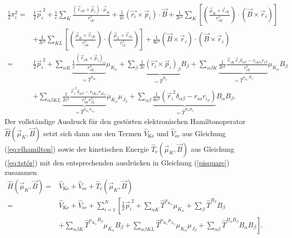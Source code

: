 	\begin{equation}\label{pisquare}
	\begin{aligned}
	\frac{1}{2}\pi_i^2=&\frac{1}{2}\vec{p}_i^{\;2}+\frac{1}{c}\sum_K\frac{(\vec{r}_{iK}\times\vec{p}_{i})\cdot\vec{\mu}_K}{r_{iK}^3}+\frac{1}{2c}(\vec{r_i}\times \vec{p}_i)\cdot \vec{B}+ \frac{1}{2c^2}\sum_K\left[\left(\frac{\vec{\mu}_K\times\vec{r}_{iK}}{r_{iK}^3}\right)\cdot\left(\vec{B}\times\vec{r}_i\right)\right]\\
	&+\frac{1}{2c^2}\sum_{KL}\left[\left(\frac{\vec{\mu}_K\times\vec{r}_{iK}}{r_{iK}^3}\right)\cdot\left(\frac{\vec{\mu}_L\times\vec{r}_{iL}}{r_{iL}^3}\right)\right]+\frac{1}{8c^2}(\vec{B}\times\vec{r}_i)\cdot(\vec{B}\times\vec{r}_i) \\
	=&\frac{1}{2}\vec{p}_i^{\;2}+\sum_{\alpha K}\underbrace{\frac{1}{c}\frac{(\vec{r}_{iK}\times\vec{p}_{i})_\alpha}{r_{iK}^3}}_{=\hat{T}^{\mu_{K_\alpha}}}\mu_{K_\alpha}+\sum_\beta\underbrace{\frac{1}{2c}(\vec{r_i}\times \vec{p}_i)_\beta}_{=\hat{T}^{B_\beta}} B_\beta+\sum_{\alpha\beta K} \underbrace{\frac{1}{2c^2}\frac{\vec{r}_{iK}\vec{r}_{i}\delta_{\alpha\beta}-r_{iK\alpha}r_{i\beta}}{r_{iK}^3}}_{=\hat{T}^{\mu_{K_\alpha}B_\beta}}\mu_{K_\alpha}B_\beta\\
	&+\sum_{\alpha\beta KL}\underbrace{\frac{1}{2c^2}\frac{\vec{r}_i^{\; 2}\delta_{\alpha\beta}-r_{iK_\alpha}r_{iL_\beta}}{r_{iK}^3r_{iL}^3}}_{=\hat{T}^{\mu_{K_\alpha}\mu_{L_\beta}}}\mu_{K_\alpha}\mu_{J_\beta}+\sum_{\alpha\beta}\underbrace{\frac{1}{8c^2}\left(\vec{r}_i^{\; 2}\delta_{\alpha\beta}-r_{i\alpha}r_{i_\beta}\right)}_{=\hat{T}^{B_\alpha B_\beta}}B_\alpha B_\beta.
	\end{aligned}
	\end{equation}
	Der vollständige Ausdruck für den gestörten elektronischen Hamiltonoperator $\hat{H}(\vec{\mu}_K,\vec{B})$ setzt sich dann aus den Termen $\hat{V}_{\textrm{Ke}}$ und $\hat{V}_{\textrm{ee}}$ aus Gleichung (\ref{eq:elhamilton}) sowie der kinetischen Energie $\hat{T}_\textrm{e}(\vec{\mu}_K,\vec{B})$ aus Gleichung (\ref{eq:tstör}) mit den entsprechenden ausdrücken in Gleichung (\ref{pisquare}) zusammen
	\begin{equation}\label{eq:hvonbmu}
	\begin{aligned}
	\hat{H}(\vec{\mu}_K,\vec{B})=&\hat{V}_{\textrm{Ke}}+\hat{V}_{\textrm{ee}}+\hat{T}_\textrm{e}(\vec{\mu}_K,\vec{B})\\
	=&\hat{V}_{\textrm{Ke}}+\hat{V}_{\textrm{ee}}+\sum_{i=1}^N\left[\frac{1}{2}\vec{p}_i^{\; 2}+\sum_{\alpha K}\hat{T}^{\mu_{K_\alpha}}\mu_{K_\alpha}+\sum_\beta\hat{T}^{B_\beta}B_\beta\right. \\
	&+\left.\sum_{\alpha\beta K}\hat{T}^{\mu_{K_\alpha}B_\beta}\mu_{K_\alpha}B_\beta+\sum_{\alpha\beta KL}\hat{T}^{\mu_{K_\alpha}\mu_{L_\beta}}\mu_{K_\alpha}\mu_{J_\beta}+\sum_{\alpha\beta}\hat{T}^{B_\alpha B_\beta}B_\alpha B_\beta\right].
	\end{aligned}
	\end{equation}
